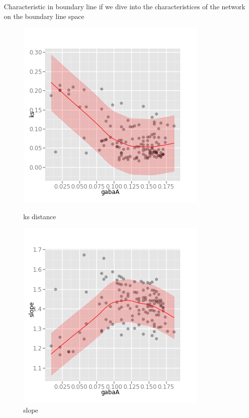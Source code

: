 \documentclass{beamer}
\begin{document}
\begin{frame}{Characteristic in boundary line}
	if we dive into the characteristices of the network on the boundary line space
	\begin{figure}[htbp]
		\centering
		\begin{minipage}{0.48\linewidth}
			\centering
			\includegraphics[width=0.85\linewidth]{fig/along_critical_ks}
			\caption{ks distance}
		\end{minipage}
		\begin{minipage}{0.48\linewidth}
			\centering
			\includegraphics[width=0.85\linewidth]{fig/along_critical_slope}
			\caption{slope}
		\end{minipage}
	\end{figure}
\end{frame}
\end{document}
